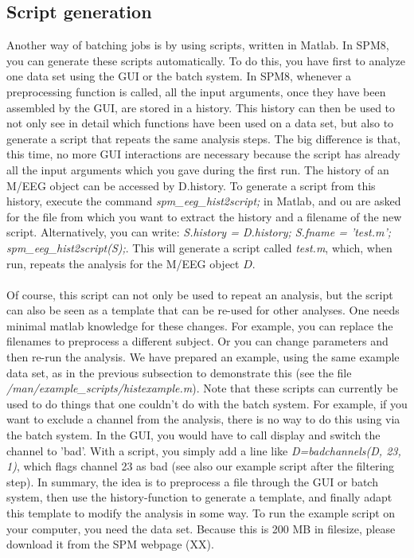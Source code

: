 \subsection{Script generation}
Another way of batching jobs is by using scripts, written in Matlab. 
In SPM8, you can generate these scripts automatically. 
To do this, you have first to analyze one data set using the 
GUI or the batch system. In SPM8, whenever a preprocessing 
function is called, all the input arguments, once they have been 
assembled by the GUI, are stored in a history. This history 
can then be used to not only see in detail which functions have
been used on a data set, but also to generate a script that 
repeats the same analysis steps. The big difference is that,
this time, no more GUI interactions are necessary because
the script has already all the input arguments which you gave
during the first run. The history of an M/EEG object can be 
accessed by D.history. To generate a script from this history,
execute the command \textit{spm\_eeg\_hist2script;} in Matlab, and 
ou are asked for the file from which you want to extract the history 
and a filename of the new script. Alternatively, 
you can write: \textit{S.history = D.history; S.fname = 'test.m'; spm\_eeg\_hist2script(S);}.
This will generate a script called \textit{test.m}, which, when run, repeats the analysis for the M/EEG object $D$. 
\\
\\
Of course, this script can not only be used to repeat an analysis, 
but the script can also be seen as a template that can be re-used 
for other analyses. One needs minimal matlab knowledge for these changes. 
For example, you can replace the filenames to preprocess a different subject.
Or you can change parameters and then re-run the analysis. We have prepared 
an example, using the same example data set, as in the previous subsection to
demonstrate this (see the file \textit{/man/example\_scripts/histexample.m}). 
Note that these scripts can currently be used to do things that one couldn't 
do with the batch system. For example, if you want to exclude a channel from 
the analysis, there is no way to do this using via the batch system. In the 
GUI, you would have to call display and switch the channel to 'bad'. With a 
script, you simply add a line like \textit{D=badchannels(D, 23, 1)}, which 
flags channel 23 as bad (see also our example script after the filtering step). 
In summary, the idea is to preprocess a file through the GUI or batch system, 
then use the history-function to generate a template, and finally adapt this 
template to modify the analysis in some way. To run the example script on your
computer, you need the data set. Because this is 200 MB in filesize, please
download it from the SPM webpage (XX).